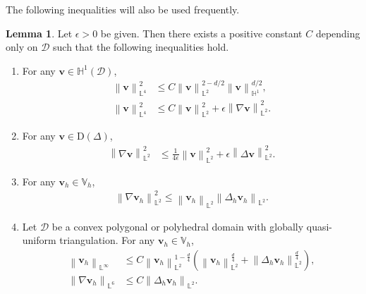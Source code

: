 \documentclass[11pt, reqno]{amsart}
\theoremstyle{definition}
\newtheorem{lemma}[theorem]{Lemma}
\theoremstyle{remark}
\numberwithin{equation}{section}
\newcommand{\bff}{\boldsymbol}
\newcommand{\bb}{\mathbb}
\newcommand{\norm}[2]{\left\|{#1}\right\|_{#2}}
\begin{document}
The following inequalities will also be used frequently.

\begin{lemma}
	Let $\epsilon>0$ be given. Then there exists a positive constant $C$ depending only on $\mathscr{D}$ such that the following inequalities hold.
	\begin{enumerate}
		\renewcommand{\labelenumi}{\theenumi}
		\renewcommand{\theenumi}{{\rm (\roman{enumi})}}
		\item For any $\bff{v} \in \bb{H}^1(\mathscr{D})$,
		\begin{align}
			\label{equ:L4 gal nir}
			\norm{\bff{v}}{\bb{L}^4}^2 
			&\leq
			C \norm{\bff{v}}{\bb{L}^2}^{2-d/2}
			\norm{\bff{v}}{\bb{H}^1}^{d/2},
			\\
			\label{equ:L4 young}
			\norm{\bff{v}}{\bb{L}^4}^2
			&\leq
			C \norm{\bff{v}}{\bb{L}^2}^2
			+
			\epsilon \norm{\nabla \bff{v}}{\bb{L}^2}^2.
		\end{align}
		
		\item For any $\bff{v} \in \mathrm{D}(\Delta)$, 
		\begin{align}
			\label{equ:equivnorm-nabL2 young}
			\norm{\nabla \bff{v}}{\bb{L}^2}^2 
			&\leq  
			\frac{1}{4\epsilon} \norm{\bff{v}}{\bb{L}^2}^2
			+ 
			\epsilon \norm{\Delta \bff{v}}{\bb{L}^2}^2.
		\end{align}
		
		\item For any $\bff{v}_h\in \bb{V}_h$,
		\begin{align}
			\label{equ:disc lapl L2}
			\norm{\nabla \bff{v}_h}{\bb{L}^2}^2
			\leq
			\norm{\bff{v}_h}{\bb{L}^2} \norm{\Delta_h \bff{v}_h}{\bb{L}^2}.
		\end{align}
		
		\item Let $\mathscr{D}$ be a convex polygonal or polyhedral domain with globally quasi-uniform triangulation. For any $\bff{v}_h\in \bb{V}_h$,
		\begin{align}
			\label{equ:disc lapl L infty}
			\norm{\bff{v}_h}{\bb{L}^\infty}
			&\leq
			C \norm{\bff{v}_h}{\bb{L}^2}^{1-\frac{d}{4}} \left(\norm{\bff{v}_h}{\bb{L}^2}^\frac{d}{4} + \norm{\Delta_h \bff{v}_h}{\bb{L}^2}^\frac{d}{4} \right),
			\\
			\label{equ:disc lapl L6}
			\norm{\nabla \bff{v}_h}{\bb{L}^6}
			&\leq
			C \norm{\Delta_h \bff{v}_h}{\bb{L}^2}.
		\end{align}
	\end{enumerate}
\end{lemma}
\end{document}
